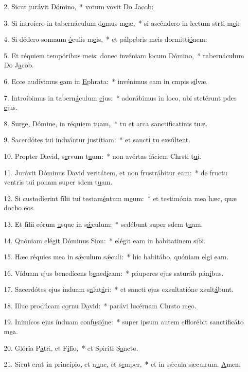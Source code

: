 2. Sicut jur\uline{á}vit D\uline{ó}mino,~* votum vovit Do J\uline{a}cob:\par 
3. Si introíero in tabernáculum d\uline{o}mus m\uline{e}æ,~* si ascéndero in lectum strti m\uline{e}i:\par 
4. Si dédero somnum \uline{ó}culis m\uline{e}is,~* et pálpebris meis dormitti\uline{ó}nem:\par 
5. Et réquiem tempóribus meis: donec invéniam l\uline{o}cum D\uline{ó}mino,~* tabernáculum Do J\uline{a}cob.\par 
6. Ecce audívimus \uline{e}am in \uline{E}phrata:~* invénimus eam in cmpis s\uline{i}lvæ.\par 
7. Introíbimus in tabern\uline{á}culum \uline{e}jus:~* adorábimus in loco, ubi stetérunt pdes \uline{e}jus.\par 
8. Surge, Dómine, in r\uline{é}quiem t\uline{u}am,~* tu et arca sanctificatinis t\uline{u}æ.\par 
9. Sacerdótes tui indu\uline{á}ntur just\uline{í}tiam:~* et sancti tu exs\uline{ú}ltent.\par 
10. Propter David, s\uline{e}rvum t\uline{u}um:~* non avértas fáciem Chrsti t\uline{u}i.\par 
11. Jurávit Dóminus David veritátem, et non frustr\uline{á}bitur \uline{e}am:~* de fructu ventris tui ponam super sdem t\uline{u}am.\par 
12. Si custodíerint fílii tui testam\uline{é}ntum m\uline{e}um:~* et testimónia mea hæc, quæ docbo \uline{e}os.\par 
13. Et fílii eórum \uline{u}sque in s\uline{ǽ}culum:~* sedébunt super sdem t\uline{u}am.\par 
14. Quóniam elégit D\uline{ó}minus S\uline{i}on:~* elégit eam in habitatinem s\uline{i}bi.\par 
15. Hæc réquies mea in s\uline{ǽ}culum s\uline{ǽ}culi:~* hic habitábo, quóniam elgi \uline{e}am.\par 
16. Víduam ejus benedícens b\uline{e}ned\uline{í}cam:~* páuperes ejus saturáb pán\uline{i}bus.\par 
17. Sacerdótes ejus índuam s\uline{a}lut\uline{á}ri:~* et sancti ejus exsultatióne xsult\uline{á}bunt.\par 
18. Illuc prodúcam c\uline{o}rnu D\uline{a}vid:~* parávi lucérnam Chrsto m\uline{e}o.\par 
19. Inimícos ejus índuam conf\uline{u}si\uline{ó}ne:~* super ipsum autem efflorébit sanctificáto m\uline{e}a.\par 
20. Glória P\uline{a}tri, et F\uline{í}lio,~* et Spiríti S\uline{a}ncto.\par 
21. Sicut erat in princípio, et n\uline{u}nc, et s\uline{e}mper,~* et in sǽcula sæculrum. \uline{A}men.\par 
